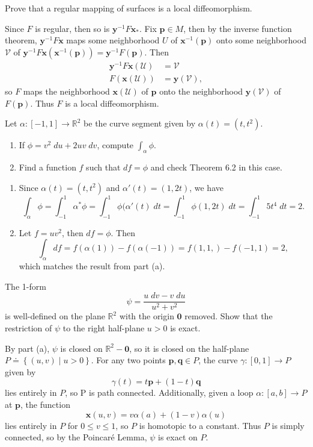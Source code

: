 \documentclass[10pt]{report}
\begin{document}

\begin{exer}[4.5: 6]
Prove that a regular mapping of surfaces is a local diffeomorphism.
\end{exer}
Since $F$ is regular, then so is $\mathbf{y}^{-1}F\mathbf{x}_{*}$. Fix $\mathbf{p} \in M$, then by the inverse function theorem, $\mathbf{y}^{-1}F\mathbf{x}$ maps some neighborhood $U$ of $\mathbf{x}^{-1}(\mathbf{p})$ onto some neighborhood $\mathcal{V}$ of $\mathbf{y}^{-1}F\mathbf{x}(\mathbf{x}^{-1}(\mathbf{p})) = \mathbf{y}^{-1}F(\mathbf{p})$. Then
\begin{align*}
	\mathbf{y}^{-1}F\mathbf{x}(\mathcal{U}) &= \mathcal{V} \\
	F(\mathbf{x}(\mathcal{U})) &= \mathbf{y}(\mathcal{V}),
\end{align*}
so $F$ maps the neighborhood $\mathbf{x}(\mathcal{U})$ of $\mathbf{p}$ onto the neighborhood $\mathbf{y}(\mathcal{V})$ of $F(\mathbf{p})$. Thus $F$ is a local diffeomorphism.

\begin{exer}[4.6: 2]
	Let $\alpha:[-1,1]\to \mathbb{R}^2$ be the curve segment given by $\alpha(t)=(t,t^2)$.
	\begin{enumerate}
		\item If $\phi=v^2\;du+2uv\;dv$, compute $\int_{\alpha} \phi$.
		\item Find a function $f$ such that $df=\phi$ and check Theorem 6.2 in this case.
	\end{enumerate}
\end{exer}
\begin{enumerate}
	\item Since $\alpha(t)=(t,t^2)$ and $\alpha'(t) = (1, 2t)$, we have
		\[
			\int_{\alpha} \phi = \int_{-1}^{1} \alpha^* \phi = \int_{-1}^{1} \phi(\alpha'(t)\;dt = \int_{-1}^{1} \phi(1, 2t)\;dt = \int_{-1}^{1} 5t^4\;dt = 2.
		\] 

	\item Let $f=uv^2$, then $df=\phi$. Then
		\[
			\int_{\alpha} df = f(\alpha(1))-f(\alpha(-1))=f(1,1,)-f(-1,1) = 2,
		\] which matches the result from part (a).
\end{enumerate}
\pagebreak

\begin{exer}[4.6: 4b]
The 1-form
\[
\psi = \frac{u\;dv - v\;du}{u^2+v^2} 
\] is well-defined on the plane $\mathbb{R}^2$ with the origin $\mathbf{0}$ removed. Show that the restriction of $\psi$ to the right half-plane $u>0$ is exact.
\end{exer}
By part (a), $\psi$ is closed on $\mathbb{R}^2-\mathbf{0}$, so it is closed on the half-plane $P \doteq \left\{ (u,v) \;|\; u>0 \right\}$. For any two points $\mathbf{p},\mathbf{q} \in P$, the curve $\gamma:[0,1] \to  P$ given by
\[
	\gamma(t) = t\mathbf{p} + (1-t)\mathbf{q}
\] lies entirely in $P$, so P is path connected. Additionally, given a loop $\alpha:[a,b] \to P$ at $\mathbf{p}$, the function
\[
	\mathbf{x}(u,v) = v\alpha(a) + (1-v)\alpha(u)
\] lies entirely in $P$ for $0 \leq v \leq 1$, so $P$ is homotopic to a constant. Thus $P$ is simply connected, so by the Poincar\'e Lemma, $\psi$ is exact on $P$.
\end{document}

